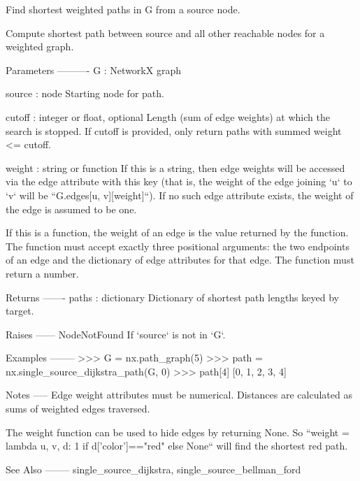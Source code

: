 \begin{DoxyVerb}Find shortest weighted paths in G from a source node.

Compute shortest path between source and all other reachable
nodes for a weighted graph.

Parameters
----------
G : NetworkX graph

source : node
    Starting node for path.

cutoff : integer or float, optional
    Length (sum of edge weights) at which the search is stopped.
    If cutoff is provided, only return paths with summed weight <= cutoff.

weight : string or function
    If this is a string, then edge weights will be accessed via the
    edge attribute with this key (that is, the weight of the edge
    joining `u` to `v` will be ``G.edges[u, v][weight]``). If no
    such edge attribute exists, the weight of the edge is assumed to
    be one.

    If this is a function, the weight of an edge is the value
    returned by the function. The function must accept exactly three
    positional arguments: the two endpoints of an edge and the
    dictionary of edge attributes for that edge. The function must
    return a number.

Returns
-------
paths : dictionary
    Dictionary of shortest path lengths keyed by target.

Raises
------
NodeNotFound
    If `source` is not in `G`.

Examples
--------
>>> G = nx.path_graph(5)
>>> path = nx.single_source_dijkstra_path(G, 0)
>>> path[4]
[0, 1, 2, 3, 4]

Notes
-----
Edge weight attributes must be numerical.
Distances are calculated as sums of weighted edges traversed.

The weight function can be used to hide edges by returning None.
So ``weight = lambda u, v, d: 1 if d['color']=="red" else None``
will find the shortest red path.

See Also
--------
single_source_dijkstra, single_source_bellman_ford\end{DoxyVerb}
 \mbox{\label{namespacenetworkx_1_1algorithms_1_1shortest__paths_1_1weighted_afec7f3d75b6973e3acc5019448258df7}} 
